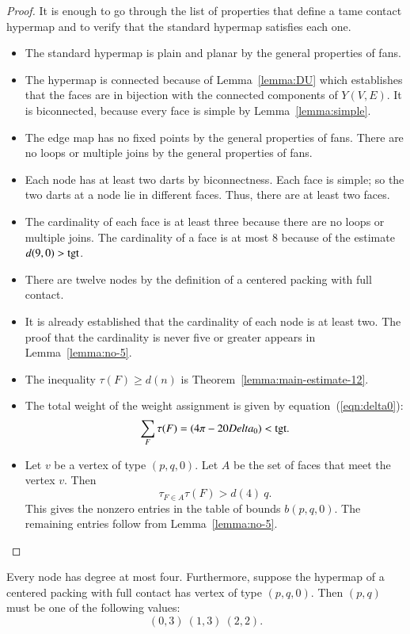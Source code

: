 \begin{proof}  It is enough to go through the list of properties that define a tame contact hypermap and to verify that the standard hypermap satisfies each one.

\begin{itemize}
\item The standard hypermap is plain and planar by the general properties of fans.
\item The hypermap is connected because of Lemma~\ref{lemma:DU} which establishes that the faces are in bijection with the connected components of $Y(V,E)$.  It is biconnected, because every face is simple by Lemma~\ref{lemma:simple}.
\item The edge map has no fixed points by the general properties of fans.  There are no loops or multiple joins by the general properties of fans.
\item  Each node has at least two darts by biconnectness. Each face is simple; so the two darts at a node lie in different faces.  Thus, there are at least two faces.
\item The cardinality of each face is at least three because there are no loops or multiple joins.  The cardinality of a face is at most $8$ because of the estimate $d(9,0)>{\operatorname{tgt}}$.  
\item There are twelve nodes by the definition of a centered packing with full contact.
\item It is already established that the cardinality of each node is at least two.  The proof that the cardinality is never five or greater appears in Lemma~\ref{lemma:no-5}.
\item The inequality $\tau(F)\ge d(n)$ is Theorem~\ref{lemma:main-estimate-12}.
\item The total weight of the weight assignment is given by equation~(\ref{eqn:delta0}):
$$
\sum_F \tau(F) = (4\pi - 20Delta_0) < {\operatorname{tgt}}.
$$
\item Let $v$ be a vertex of type $(p,q,0)$.  Let $A$ be the set of faces that meet the vertex $v$. Then 
$$
\tau_{F\in A}\tau(F) > d(4)~q.
$$
This gives the nonzero entries in the table of bounds $b(p,q,0)$.  The remaining entries follow from Lemma~\ref{lemma:no-5}.
\end{itemize}
\end{proof}




\begin{lemma}\label{lemma:no-5} 
Every node has degree at most four.
Furthermore, suppose the hypermap of a centered packing with full contact has vertex of type $(p,q,0)$.  Then $(p,q)$ must be one of the following values:
$$
(0,3)~(1,3)~(2,2).
$$
\end{lemma}

